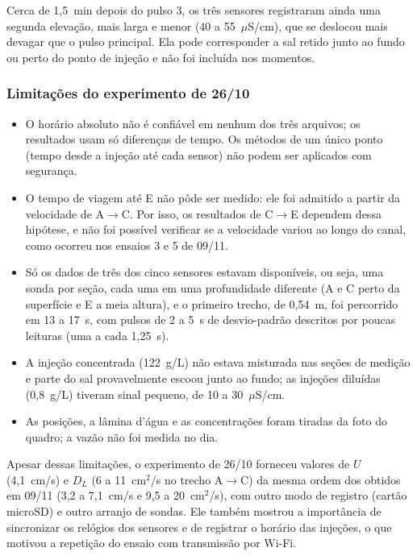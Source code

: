 \documentclass[12pt,a4paper]{article}
\providecommand{\uScm}{\ensuremath{\mu}S/cm}
\begin{document}
Cerca de 1,5~min depois do pulso 3, os três sensores registraram ainda uma segunda elevação, mais larga e menor (40 a 55~\uScm), que se deslocou mais devagar que o pulso principal. Ela pode corresponder a sal retido junto ao fundo ou perto do ponto de injeção e não foi incluída nos momentos.

\subsubsection{Limitações do experimento de 26/10}
\begin{itemize}
  \item O horário absoluto não é confiável em nenhum dos três arquivos; os resultados usam só diferenças de tempo. Os métodos de um único ponto (tempo desde a injeção até cada sensor) não podem ser aplicados com segurança.
  \item O tempo de viagem até E não pôde ser medido: ele foi admitido a partir da velocidade de A$\rightarrow$C. Por isso, os resultados de C$\rightarrow$E dependem dessa hipótese, e não foi possível verificar se a velocidade variou ao longo do canal, como ocorreu nos ensaios 3 e 5 de 09/11.
  \item Só os dados de três dos cinco sensores estavam disponíveis, ou seja, uma sonda por seção, cada uma em uma profundidade diferente (A e C perto da superfície e E a meia altura), e o primeiro trecho, de 0,54~m, foi percorrido em 13 a 17~s, com pulsos de 2 a 5~s de desvio-padrão descritos por poucas leituras (uma a cada 1,25~s).
  \item A injeção concentrada (122~g/L) não estava misturada nas seções de medição e parte do sal provavelmente escoou junto ao fundo; as injeções diluídas (0,8~g/L) tiveram sinal pequeno, de 10 a 30~\uScm.
  \item As posições, a lâmina d'água e as concentrações foram tiradas da foto do quadro; a vazão não foi medida no dia.
\end{itemize}

Apesar dessas limitações, o experimento de 26/10 forneceu valores de $U$ (4,1~cm/s) e $D_L$ (6 a 11~cm$^2$/s no trecho A$\rightarrow$C) da mesma ordem dos obtidos em 09/11 (3,2 a 7,1~cm/s e 9,5 a 20~cm$^2$/s), com outro modo de registro (cartão microSD) e outro arranjo de sondas. Ele também mostrou a importância de sincronizar os relógios dos sensores e de registrar o horário das injeções, o que motivou a repetição do ensaio com transmissão por Wi-Fi.

\end{document}
